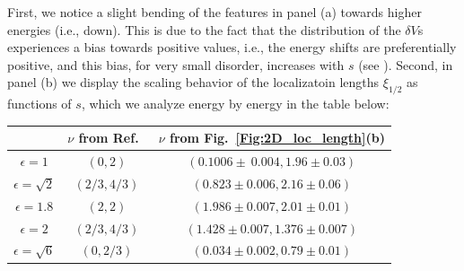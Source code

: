 \documentclass[prl,aps,twocolumn,showpacs,superscriptaddress,longbibliography]{revtex4-1}
\begin{document}
First, we notice a slight bending of the features in panel (a) towards higher energies (i.e., down). This is due to the fact that the distribution of the $\delta V$s experiences a bias towards positive values, i.e., the energy shifts are preferentially positive, and this bias, for very small disorder, increases with $s$ (see \cite{SM}).
Second, in panel (b) we display the scaling behavior of the localizatoin lengths $\xi_{1/2}$ as functions of $s$, which we analyze energy by energy in the table below: 
\begin{center}
\begin{tabular}{ | c || c | c |} \hline
   & $\nu$ from Ref.~\cite{Leykam2017} & $\nu$ from Fig.~\ref{Fig:2D_loc_length}(b) \\ 
   \hline \hline
 $\epsilon = 1$ & $(0,2)$ & $(0.1006 \pm ~0.004, 1.96 \pm 0.03)$ \\ \hline  
 $\epsilon = \sqrt{2}$ & $(2/3, 4/3)$ & $(0.823 \pm 0.006, 2.16 \pm 0.06)$  \\ \hline
 $\epsilon  = 1.8$ & $(2,2)$ & $(1.986 \pm 0.007, 2.01 \pm 0.01)$ \\ \hline
 $\epsilon = 2$ & $(2/3, 4/3)$ & $(1.428 \pm 0.007, 1.376 \pm 0.007)$ \\ \hline
 $\epsilon = \sqrt{6}$ & $(0, 2/3)$ & $(0.034 \pm 0.002, 0.79 \pm 0.01)$ \\
 \hline
\end{tabular}
\end{center}
\end{document}
